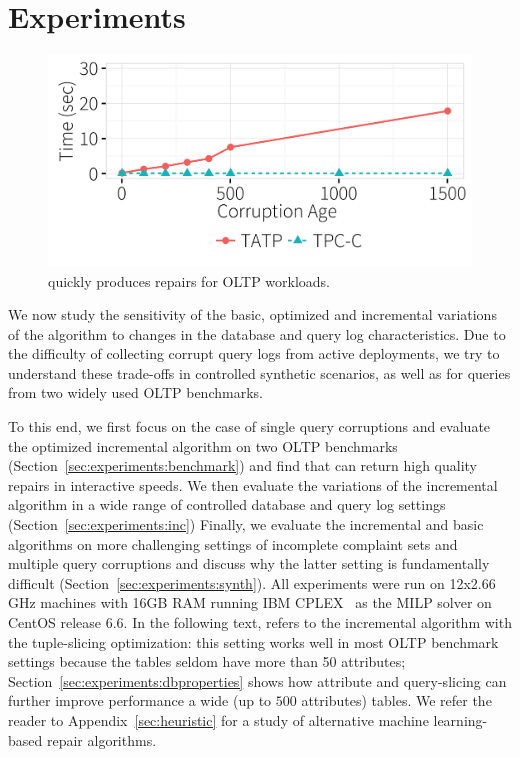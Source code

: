 


\section{Experiments}
\label{sec:experiments}

\begin{figure}[t]
\centering
  \includegraphics[width = .75\columnwidth]{figures/benchmark_time}
  \vspace*{-.2in}
  \caption{\sys quickly produces repairs for OLTP workloads.}
  \label{f:tpcctatp} 
\end{figure}


We now study the sensitivity of the basic, optimized and incremental variations of the \sys algorithm 
to changes in the database and query log characteristics.
Due to the difficulty of collecting corrupt query logs from active deployments, 
we try to understand these trade-offs in controlled synthetic scenarios, as well as for queries from two widely used OLTP benchmarks.

To this end, we first focus on the case of single query corruptions and evaluate
the optimized \sys incremental algorithm on two OLTP benchmarks (Section~\ref{sec:experiments:benchmark}) and find that \sys can return high quality repairs in interactive speeds.
We then evaluate the variations of the incremental algorithm in a wide range of controlled database and query log settings (Section~\ref{sec:experiments:inc})
Finally, we evaluate the incremental and basic algorithms on more challenging settings of incomplete complaint sets and multiple query corruptions and discuss why the latter setting is fundamentally difficult (Section~\ref{sec:experiments:synth}).
All experiments were run on 12x2.66 GHz  machines with 16GB RAM running IBM CPLEX~\cite{cplex2014v12} as the MILP solver on CentOS release 6.6.
In the following text, \sys refers to the incremental algorithm with the tuple-slicing optimization: this setting works well in most OLTP benchmark settings because the tables
seldom have more than 50 attributes; Section~\ref{sec:experiments:dbproperties} shows how attribute and query-slicing can further improve performance a wide (up to $500$ attributes) tables.
We refer the reader to Appendix~\ref{sec:heuristic} for a study of alternative machine learning-based repair algorithms.


